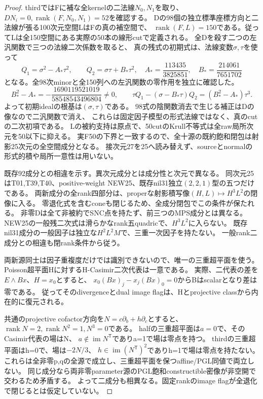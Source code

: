 \documentclass[a4paper,11pt]{ltjsarticle}
\theoremstyle{definition}
\newcommand{\rank}{\operatorname{rank}}
\begin{document}
\begin{proof}
thirdではFに補な全kernelの二法線$N_0,N_1$を取り、
$DN_i=0,\rank(F,N_0,N_1)=52$を確認する。
Dの98個の独立標準座標方向と二法線が張る100次元空間LはFの真の補空間で、
$\rank(F,L)=150$である。従ってLは全150空間にある実際の50本の線形cutで定義される。
全Dを殺す二つの左汎関数で三つの法線二次係数を取ると、
真の残式の初期式は、法線変数$\sigma,\tau$を使って
\[
 Q_1=\sigma^2-A_*\tau^2,\qquad Q_2=\sigma\tau+B_*\tau^2,
 \quad A_*=\frac{113435}{3825851},\quad B_*=\frac{214061}{7651702}
\]
となる。全98次minorと全150列への左汎関数の零作用を独立に確認した。
\[
 B_*^2-A_*=-\frac{1690119521019}{58548543496804}\ne0,\qquad
 \tau Q_1-(\sigma-B_*\tau)Q_2=(B_*^2-A_*)\tau^3.
\]
よって初期idealの根基は$(\sigma,\tau)$である。
98式の陰関数消去で生じる補正はDの像なので二汎関数で消え、
これらは固定因子模型の形式法線ではなく、真のcutの二次初項である。
Lの被約支持は原点で、50cutのKrull不等式は全raw局所次元を50以下に抑える。
実F50の下界と一致するので、全十源の既約飽和閉包は射影25次元の全空間成分となる。
接次元27を25へ読み替えず、sourceとnormalの形式的積や局所一意性は用いない。

既存92成分との相違を示す。異次元成分とは成分性と次元で異なる。
同次元25はT01,T39,T40、positive-weight NEW25、既存nil31独立$(2,2,1)$型の五つだけである。
両新成分の全rank四部分は、properな射影積写像$(H,L)\mapsto H^3L^2$の閉像に入る。
零退化式を含むconeも閉じるため、全成分閉包でこの条件が保たれる。
非零Dは全て非被約でSNC点を持たず、前三つのMPS成分とは異なる。
NEW25の一般残二次式は滑らかなrank五quadricで、$H^3L^2$に入らない。
既存nil31成分の一般因子は独立な$H^2L^2M$で、三重一次因子を持たない。
一般rank二成分との相違も閉rank条件から従う。

両新源同士は因子重複度だけでは識別できないので、唯一の三重超平面を使う。
Poisson超平面Hに対するH-Casimir二次代表は一意である。
実際、二代表の差を$E\wedge Bx$、$H=x_0$とすると、
$x_0(Bx)_j-x_j(Bx)_0=0$からBはscalarとなり差は零である。
従ってそのdivergenceとdual image flagは、Hとprojective classから内在的に復元される。

共通のprojective cofactor方向を$N=c\partial_b+h\partial_c$とすると、
$\rank N=2,\rank N^2=1,N^3=0$である。
halfの三重超平面は$a=0$で、そのCasimir代表の場はN、
$a\notin\operatorname{im}N^{\mathsf T}$でありa=1で場は零点を持つ。
thirdの三重超平面はh=0で、場は$-2N/3$、
$h\in\operatorname{im}(N^{\mathsf T})^2$でありh=1で場は零点を持たない。
これらは全非零p,qの全源で成立し、三重超平面を保つaffine/PGL同値で両立しない。
同じ成分なら両非零parameter源のPGL飽和constructible密像が非空開で交わるため矛盾する。
よって二成分も相異なる。固定rankのimage flagが全退化で閉じるとは仮定していない。
\end{proof}
\end{document}

